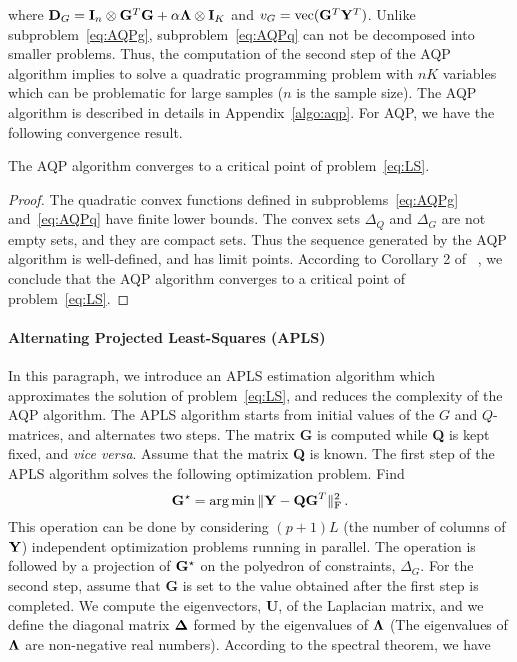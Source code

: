 \noindent where ${\bf D}_G = {\bf I}_{n} \otimes {\bf G}^T {\bf G } + \alpha {\bf \Lambda}  \otimes {\bf I}_K$ and $v_G = {\rm vec}({\bf G}^T{\bf  Y}^T)$. Unlike subproblem~\eqref{eq:AQPg}, subproblem~\eqref{eq:AQPq} can not be decomposed into smaller problems. Thus, the computation of the second step of the AQP algorithm implies to solve a quadratic programming problem with $nK$ variables which can be problematic for large samples ($n$ is the sample size). 
The AQP algorithm is described in details in Appendix~\ref{algo:aqp}. For AQP, we have the following convergence result.
\begin{thm}
\label{th}
	The AQP algorithm converges to a critical point of problem~\eqref{eq:LS}.
\end{thm}
\begin{proof}
The quadratic convex functions defined in subproblems~\eqref{eq:AQPg} and~\eqref{eq:AQPq} have finite lower bounds. The convex sets $\Delta_Q$ and $\Delta_G$ are not empty sets, and they are compact sets. Thus the sequence generated by the AQP algorithm is well-defined, and has limit points.
According to Corollary 2 of ~\cite{Grippo2000}, we conclude that
the AQP algorithm converges to a critical point of problem~\eqref{eq:LS}.
\end{proof}

\paragraph{Alternating Projected Least-Squares (APLS)} In this paragraph, we introduce an APLS estimation algorithm which approximates the solution of problem~\eqref{eq:LS}, and reduces the complexity of the AQP algorithm. The APLS algorithm starts from initial values of the $G$ and $Q$-matrices, and alternates two steps. The matrix {\bf G} is computed  while  {\bf Q} is kept fixed, and {\it vice versa}. Assume that the matrix {\bf Q} is known. The first step of the APLS algorithm solves the following optimization problem. Find 
\begin{equation}
{\bf G}^\star = \arg \min  \|  {\bf Y} - {\bf QG}^T \|^2_{\rm F} \, .
\end{equation}
This operation can be done by considering $(p+1)L$ (the number of columns of ${\bf Y}$) independent optimization problems running in parallel. The operation is followed by a projection of ${\bf G}^\star$ on the polyedron of constraints, $\Delta_G$. For the second step, assume that {\bf G} is set to the value obtained after the first step is completed. We compute the eigenvectors, {\bf U}, of the Laplacian matrix, and we define the diagonal matrix ${\bf \Delta}$ formed by the eigenvalues of ${\bf \Lambda}$ (The eigenvalues of ${\bf \Lambda}$ are non-negative real numbers). According to the spectral theorem, we have

